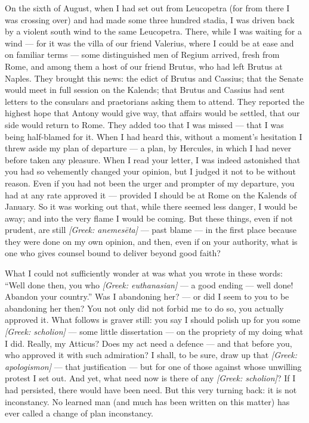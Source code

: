 

 On the sixth of August, when I had set out from Leucopetra (for from there I was crossing over) and had made some three hundred stadia, I was driven back by a violent south wind to the same Leucopetra. There, while I was waiting for a wind --- for it was the villa of our friend Valerius, where I could be at ease and on familiar terms --- some distinguished men of Regium arrived, fresh from Rome, and among them a host of our friend Brutus, who had left Brutus at Naples. They brought this news: the edict of Brutus and Cassius; that the Senate would meet in full session on the Kalends; that Brutus and Cassius had sent letters to the consulars and praetorians asking them to attend. They reported the highest hope that Antony would give way, that affairs would be settled, that our side would return to Rome. They added too that I was missed --- that I was being half-blamed for it. When I had heard this, without a moment's hesitation I threw aside my plan of departure --- a plan, by Hercules, in which I had never before taken any pleasure. When I read your letter, I was indeed astonished that you had so vehemently changed your opinion, but I judged it not to be without reason. Even if you had not been the urger and prompter of my departure, you had at any rate approved it --- provided I should be at Rome on the Kalends of January. So it was working out that, while there seemed less danger, I would be away; and into the very flame I would be coming. But these things, even if not prudent, are still \textit{[Greek: anemesēta]} --- past blame --- in the first place because they were done on my own opinion, and then, even if on your authority, what is one who gives counsel bound to deliver beyond good faith?

 What I could not sufficiently wonder at was what you wrote in these words: ``Well done then, you who \textit{[Greek: euthanasian]} --- a good ending --- well done! Abandon your country.'' Was I abandoning her? --- or did I seem to you to be abandoning her then? You not only did not forbid me to do so, you actually approved it. What follows is graver still: you say I should polish up for you some \textit{[Greek: scholion]} --- some little dissertation --- on the propriety of my doing what I did. Really, my Atticus? Does my act need a defence --- and that before you, who approved it with such admiration? I shall, to be sure, draw up that \textit{[Greek: apologismon]} --- that justification --- but for one of those against whose unwilling protest I set out. And yet, what need now is there of any \textit{[Greek: scholion]}? If I had persisted, there would have been need. But this very turning back: it is not inconstancy. No learned man (and much has been written on this matter) has ever called a change of plan inconstancy.

